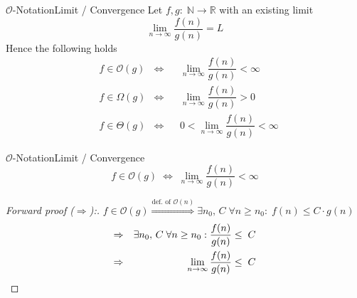 \begin{frame}{$\mathcal{O}$-Notation}{Limit / Convergence}
\label{slide:fraction}
  Let $f,g \! : \; \mathbb{N} \to \mathbb{R}$ with an existing limit
  \[\lim_{n \to \infty} \dfrac{f(n)}{g(n)} = L\]
  Hence the following holds
  \begin{align}
\label{eq:big-O}    & f \in \mathcal{O}(g) & \Leftrightarrow
    && \lim_{n \to \infty} \dfrac{f(n)}{g(n)} < \infty\\
    & f \in \Omega(g) & \Leftrightarrow
    && \lim_{n \to \infty} \dfrac{f(n)}{g(n)} > 0\\
    & f \in \Theta(g) & \Leftrightarrow
    && 0 < \lim_{n \to \infty} \dfrac{f(n)}{g(n)} < \infty
  \end{align}
\end{frame}


\begin{frame}{$\mathcal{O}$-Notation}{Limit / Convergence}
  \[
    f \in \mathcal{O}(g)
    \; \Leftrightarrow \;
    \lim\limits_{n \rightarrow \infty} \frac{f(n)}{g(n)} < \infty
  \]
  \begin{proof}[Forward proof ($\Rightarrow$):]
     $f \in \mathcal{O}(g) \stackrel{\text{def. of }\mathcal{O}(n)}{\Rightarrow}
     \exists n_0, \, C\; \forall n \geq n_0:
     \; f(n) \leq C \cdot g(n)$
     \begin{alignat*}{2}
       \Rightarrow && \exists n_0, \, C\; \forall n \geq n_0: \dfrac{f(n)}{g(n)} &\leq \; C\\
       \Rightarrow && \displaystyle
       \lim_{n \to \infty}\dfrac{f(n)}{g(n)} &\leq \; C
       \qedhere
      \end{alignat*}
  \end{proof}
\end{frame}


